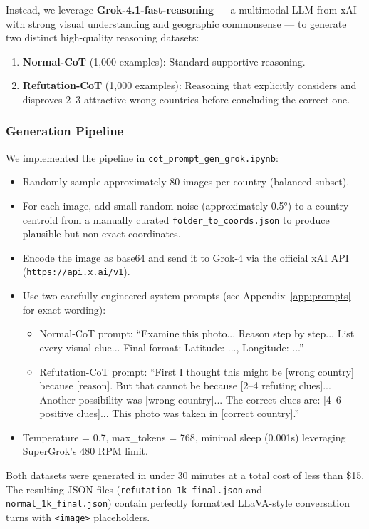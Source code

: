 \documentclass[11pt,a4paper]{article}
\begin{document}
Instead, we leverage \textbf{Grok-4.1-fast-reasoning} — a multimodal LLM from xAI with strong visual understanding and geographic commonsense — to generate two distinct high-quality reasoning datasets:

\begin{enumerate}
    \item \textbf{Normal-CoT} (1,000 examples): Standard supportive reasoning.
    \item \textbf{Refutation-CoT} (1,000 examples): Reasoning that explicitly considers and disproves 2--3 attractive wrong countries before concluding the correct one.
\end{enumerate}

\subsubsection{Generation Pipeline}
We implemented the pipeline in \texttt{cot_prompt_gen_grok.ipynb}:
\begin{itemize}
    \item Randomly sample approximately 80 images per country (balanced subset).
    \item For each image, add small random noise (approximately 0.5°) to a country centroid from a manually curated \texttt{folder_to_coords.json} to produce plausible but non-exact coordinates.
    \item Encode the image as base64 and send it to Grok-4 via the official xAI API (\texttt{https://api.x.ai/v1}).
    \item Use two carefully engineered system prompts (see Appendix~\ref{app:prompts} for exact wording):
    \begin{itemize}
        \item Normal-CoT prompt: ``Examine this photo... Reason step by step... List every visual clue... Final format: Latitude: ..., Longitude: ...''
        \item Refutation-CoT prompt: ``First I thought this might be [wrong country] because [reason]. But that cannot be because [2--4 refuting clues]... Another possibility was [wrong country]... The correct clues are: [4--6 positive clues]... This photo was taken in [correct country].''
    \end{itemize}
    \item Temperature = 0.7, max\_tokens = 768, minimal sleep (0.001s) leveraging SuperGrok's 480 RPM limit.
\end{itemize}

Both datasets were generated in under 30 minutes at a total cost of less than \$15. The resulting JSON files (\texttt{refutation_1k_final.json} and \texttt{normal_1k_final.json}) contain perfectly formatted LLaVA-style conversation turns with \texttt{<image>} placeholders.
\end{document}
